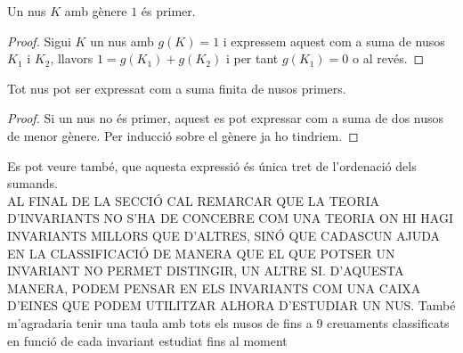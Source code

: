 \begin{corolary}
	Un nus $K$ amb gènere $1$ és primer.
\end{corolary}

\begin{proof}
	Sigui $K$ un nus amb $g(K)=1$ i expressem aquest com a suma de nusos $K_1$ i $K_2$, llavors $1=g(K_1)+g(K_2)$ i per tant $g(K_1)=0$ o al revés.
\end{proof}

\begin{corolary}
	Tot nus pot ser expressat com a suma finita de nusos primers.
\end{corolary}

\begin{proof}
	Si un nus no és primer, aquest es pot expressar com a suma de dos nusos de menor gènere. Per inducció sobre el gènere ja ho tindriem.
\end{proof}

Es pot veure també, que aquesta expressió és única tret de l'ordenació dels sumands.\\

AL FINAL DE LA SECCIÓ CAL REMARCAR QUE LA TEORIA D'INVARIANTS NO S'HA DE CONCEBRE COM UNA TEORIA ON HI HAGI INVARIANTS MILLORS QUE D'ALTRES, SINÓ QUE CADASCUN AJUDA EN LA CLASSIFICACIÓ DE MANERA QUE EL QUE POTSER UN INVARIANT NO PERMET DISTINGIR, UN ALTRE SI. D'AQUESTA MANERA, PODEM PENSAR EN ELS INVARIANTS COM UNA CAIXA D'EINES QUE PODEM UTILITZAR ALHORA D'ESTUDIAR UN NUS. També m'agradaria tenir una taula amb tots els nusos de fins a 9 creuaments classificats en funció de cada invariant estudiat fins al moment